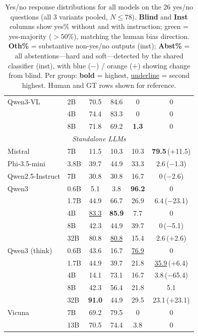 \begin{table}[h]
\begin{tabular}{ll cccc}
Qwen3-VL & 2B & \cellcolor{green!15}70.5 & \cellcolor{green!15}84.6 & 0 & 0 \\
 & 4B & \cellcolor{green!15}74.4 & \cellcolor{green!15}83.3 & 0 & 0 \\
 & 8B & \cellcolor{green!15}71.8 & \cellcolor{green!15}69.2 & \textbf{1.3} & 0 \\
\midrule
\multicolumn{6}{c}{\textit{Standalone LLMs}}\\
\midrule
Mistral & 7B & 11.5 & 10.3 & 10.3 & \textbf{79.5}\,{\scriptsize\textcolor[HTML]{D6610A}{($+$11.5)}} \\
Phi-3.5-mini & 3.8B & 39.7 & 44.9 & 33.3 & 2.6\,{\scriptsize\textcolor[HTML]{2166AC}{($-$1.3)}} \\
Qwen2.5-Instruct & 7B & 30.8 & 30.8 & 16.7 & 0\,{\scriptsize\textcolor[HTML]{2166AC}{($-$2.6)}} \\
Qwen3 & 0.6B & 5.1 & 3.8 & \textbf{96.2} & 0 \\
 & 1.7B & 44.9 & \cellcolor{green!15}66.7 & 26.9 & 6.4\,{\scriptsize\textcolor[HTML]{2166AC}{($-$23.1)}} \\
 & 4B & \cellcolor{green!15}\underline{83.3} & \cellcolor{green!15}\textbf{85.9} & 7.7 & 0 \\
 & 8B & 42.3 & 44.9 & 39.7 & 0\,{\scriptsize\textcolor[HTML]{2166AC}{($-$5.1)}} \\
 & 32B & \cellcolor{green!15}80.8 & \cellcolor{green!15}\underline{80.8} & 15.4 & 2.6\,{\scriptsize\textcolor[HTML]{D6610A}{($+$2.6)}} \\
Qwen3 (think) & 0.6B & 43.6 & 16.7 & \underline{76.9} & 0 \\
 & 1.7B & 44.9 & 39.7 & 21.8 & \underline{35.9}\,{\scriptsize\textcolor[HTML]{D6610A}{($+$6.4)}} \\
 & 4B & 14.1 & \cellcolor{green!15}73.1 & 16.7 & 3.8\,{\scriptsize\textcolor[HTML]{2166AC}{($-$65.4)}} \\
 & 8B & 42.3 & \cellcolor{green!15}56.4 & 21.8 & 5.1 \\
 & 32B & \cellcolor{green!15}\textbf{91.0} & 44.9 & 29.5 & 23.1\,{\scriptsize\textcolor[HTML]{D6610A}{($+$23.1)}} \\
Vicuna & 7B & \cellcolor{green!15}69.2 & \cellcolor{green!15}79.5 & 0 & 0 \\
 & 13B & \cellcolor{green!15}70.5 & \cellcolor{green!15}74.4 & 3.8 & 0 \\
\bottomrule
\end{tabular}
\caption{Yes/no response distributions for all models on the 26 yes/no questions (all 3 variants pooled, $N{\leq}78$). \textbf{Blind} and \textbf{Inst} columns show yes\% without and with instruction; \colorbox{green!15}{green} = yes-majority ($>{50}\%$), matching the human bias direction. \textbf{Oth\%} = substantive non-yes/no outputs (inst); \textbf{Abst\%} = all abstentions---hard and soft---detected by the shared classifier (inst), with \textcolor[HTML]{2166AC}{blue} ($-$) / \textcolor[HTML]{D6610A}{orange} ($+$) showing change from blind. Per group: \textbf{bold} = highest, \underline{underline} = second highest. Human and GT rows shown for reference.}
\label{tab:yesno_distribution_all}
\end{table}
